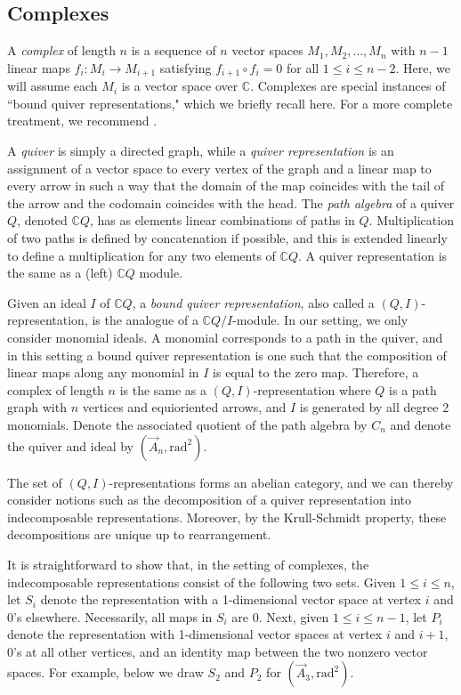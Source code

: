 \documentclass{amsart}
\theoremstyle{definition}
\begin{document}
\subsection{Complexes}\label{sec:complexes}

A \emph{complex} of length $n$ is a sequence of $n$  vector spaces $M_1,M_2,\ldots,M_n$ with $n-1$ linear maps $f_i: M_i \to M_{i+1}$ satisfying $f_{i+1} \circ f_i = 0$ for all $1 \leq i \leq n-2$. Here, we will assume each $M_i$ is a vector space over $\mathbb{C}$.
Complexes are special instances of ``bound quiver representations," which we briefly recall here. For a more complete treatment, we recommend \cite{Assem,schiffler2014quiver}. 

A \emph{quiver} is simply  a directed graph, while a \emph{quiver representation} is an assignment of a vector space to every vertex of the graph and a linear map to every arrow in such a way that the domain of the map coincides with the tail of the arrow and the codomain coincides with the head. The \emph{path algebra} of a quiver $Q$, denoted $\mathbb{C}Q$, has as elements linear combinations of paths in $Q$. Multiplication of two paths is defined by concatenation if possible, and this is extended linearly to define a multiplication for any two elements of $\mathbb{C}Q$. A quiver representation is the same as a (left) $\mathbb{C}Q$ module.

Given an ideal $I$ of $\mathbb{C}Q$, a \emph{bound quiver representation}, also called a $(Q,I)$-representation, is the analogue of a $\mathbb{C}Q/I$-module. In our setting, we only consider monomial ideals. A monomial corresponds to a path in the quiver, and in this setting a bound quiver representation is one such that the composition of linear maps along any monomial in $I$ is equal to the zero map. Therefore, a complex of length $n$ is the same as a $(Q,I)$-representation where $Q$ is a path graph with $n$ vertices and equioriented arrows, and $I$ is generated by all degree 2 monomials. Denote the associated quotient of the path algebra by $C_n$ and denote the quiver and ideal by $(\overrightarrow{A}_n,\mathrm{rad}^2)$.


The set of $(Q,I)$-representations forms an abelian category, and we can thereby consider notions such as the decomposition of a quiver representation into indecomposable representations. Moreover, by the Krull-Schmidt property, these decompositions are unique up to rearrangement. 

It is straightforward to show that, in the setting of complexes, the indecomposable representations consist of the following two sets. Given $1 \leq i \leq n$, let $S_i$ denote the representation with a 1-dimensional vector space at vertex $i$ and 0's elsewhere. Necessarily, all maps in $S_i$ are 0. Next, given $1 \leq i \leq n-1$, let $P_i$ denote the representation with 1-dimensional vector spaces at vertex $i$ and $i+1$, 0's at all other vertices, and an identity map between the two nonzero vector spaces. For example, below we draw $S_2$ and $P_2$ for $(\overrightarrow{A}_3, \mathrm{rad}^2)$.
\end{document}
